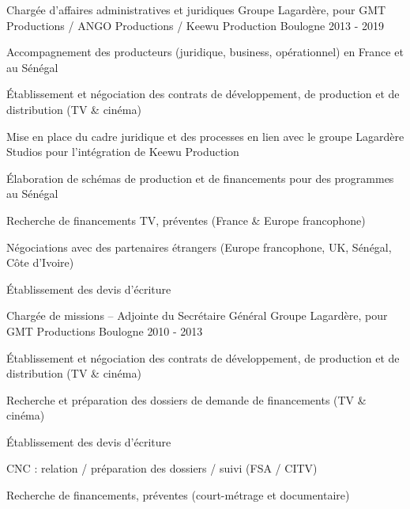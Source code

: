 \begin{cventries}
  \cventry
    {Chargée d’affaires administratives et juridiques} %
    {Groupe Lagardère, pour GMT Productions / ANGO Productions / Keewu Production} %
    {Boulogne} %
    {2013 - 2019} %
    {
      \begin{cvitems} %
        \item {Accompagnement des producteurs (juridique, business, opérationnel) en France et au Sénégal}
        \item {Établissement et négociation des contrats de développement, de production et de distribution (TV \& cinéma)}
        \item {Mise en place du cadre juridique et des processes en lien avec le groupe Lagardère Studios pour l’intégration de Keewu Production}
        \item {Élaboration de schémas de production et de financements pour des programmes au Sénégal}
        \item {Recherche de financements TV, préventes (France \& Europe francophone)}
        \item {Négociations avec des partenaires étrangers (Europe francophone, UK, Sénégal, Côte d’Ivoire)}
        \item {Établissement des devis d’écriture}
      \end{cvitems}
    }

  \cventry
    {Chargée de missions – Adjointe du Secrétaire Général} %
    {Groupe Lagardère, pour GMT Productions} %
    {Boulogne} %
    {2010 - 2013} %
    {
      \begin{cvitems} %
        \item {Établissement et négociation des contrats de développement, de production et de distribution (TV \& cinéma)}
        \item {Recherche et préparation des dossiers de demande de financements (TV \& cinéma)}
        \item {Établissement des devis d’écriture}
        \item {CNC : relation / préparation des dossiers / suivi (FSA / CITV)}
        \item {Recherche de financements, préventes (court-métrage et documentaire)}
      \end{cvitems}
    }


\end{cventries}
